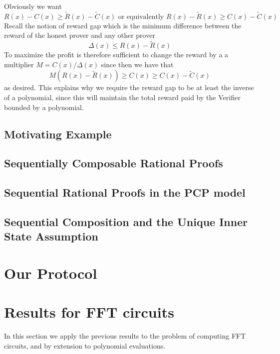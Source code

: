 Obviously we want
\[ R(x)-C(x) \geq \tilde{R}(x)-\tilde{C}(x) \mbox{ or equivalently } 
R(x)-\tilde{R}(x) \geq C(x) - \tilde{C}(x) \]
Recall the notion of reward gap which is the minimum difference between the reward of the honest prover and any other prover
\[ \Delta(x) \leq R(x)-\tilde{R}(x) \]
To maximize the profit is therefore sufficient to change the reward by a 
a multiplier $M= C(x)/\Delta(x)$ since then we have that 
\[ M(R(x) - \tilde{R}(x)) \geq C(x) \geq C(x) - \tilde{C}(x) \]
as desired. This explains why we require the reward gap to be at least the inverse of a polynomial, since this will maintain the total reward paid by the Verifier bounded by a polynomial. 

\subsection{Motivating Example}


\subsection{Sequentially Composable Rational Proofs}


\subsection{Sequential Rational Proofs in the PCP model}


\subsection{Sequential Composition and the Unique Inner State Assumption}
\label{sec:uisa}


\section{Our Protocol}


\section{Results for FFT circuits}

In this section we apply the previous results to the problem of computing FFT circuits, and by extension to polynomial evaluations. 


